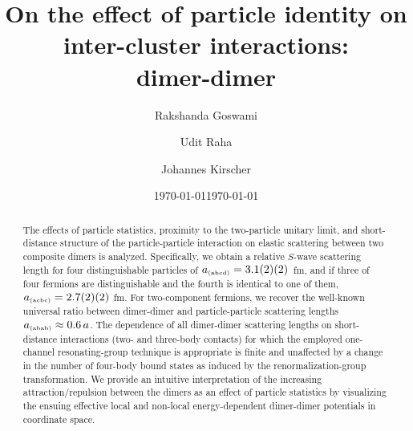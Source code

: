 \documentclass[preprint,aps,onecolumn,preprintnumbers,amsmath,amssymb,nofootinbib,superscriptaddress]{revtex4-1}
\newcommand{\abcd}{\ensuremath{a_\text{\tiny (abcd)}}}
\newcommand{\abcc}{\ensuremath{a_\text{\tiny (acbc)}}}
\newcommand{\add}{\ensuremath{a_\text{\tiny (abab)}}}
\begin{document}
\title{On the effect of particle identity on inter-cluster interactions:\\
dimer-dimer}

\author{Rakshanda Goswami}
\author{Udit Raha}
\address{Department of Physics, Indian Institute of Technology Guwahati, Guwahati 781039, India}
\author{Johannes Kirscher}
\address{Department of Physics, SRM University - AP, Amaravati 522502, Andhra Pradesh, India}
\date{\today}

\date{\today}

\begin{abstract}
The effects of particle statistics, proximity to the two-particle unitary limit,
and short-distance structure of the particle-particle interaction on
elastic scattering between two composite dimers is analyzed. Specifically, we
obtain a relative $S$-wave scattering length for four distinguishable particles of $\abcd=3.1(2)(2)$~fm,
and if three of four fermions are distinguishable and the fourth is identical to one of them,
$\abcc=2.7(2)(2)~$fm. For two-component fermions, we recover the well-known universal ratio between
dimer-dimer and particle-particle scattering lengths
$\add\approx0.6\,a$.
The dependence of all dimer-dimer scattering lengths on short-distance interactions (two- and three-body contacts)
for which the employed one-channel resonating-group technique is appropriate is finite and unaffected by a
change in the number of four-body bound states as induced by the renormalization-group transformation.
We provide an intuitive interpretation of the increasing attraction/repulsion between the dimers as an
effect of particle statistics by visualizing the ensuing effective local and non-local energy-dependent
dimer-dimer potentials in coordinate space.
\end{abstract}

\maketitle
\end{document}
